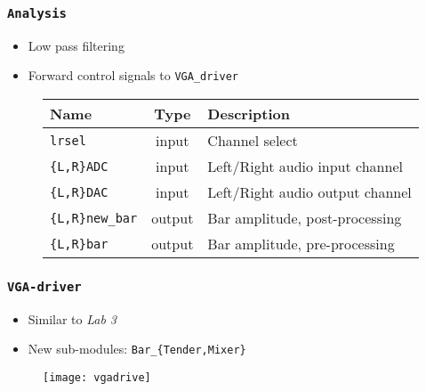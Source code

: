\begin{frame}
  \frametitle{\texttt{Analysis}}
    \begin{itemize}
      \item Low pass filtering
      \item Forward control signals to \texttt{VGA\_driver}
    \end{itemize}
    \begin{figure}
      \centering
      \begin{tabular}{|l|c|l|}
        \hline
        Name & Type & Description \\    \hline
        \texttt{lrsel} & input & Channel select \\    \hline
        \texttt{\{L,R\}ADC} & input & Left/Right audio input channel \\    \hline
        \texttt{\{L,R\}DAC} & input & Left/Right audio output channel \\    \hline
        \texttt{\{L,R\}new\_bar} & output & Bar amplitude, post-processing\\    \hline
        \texttt{\{L,R\}bar} & output & Bar amplitude, pre-processing\\    \hline
      \end{tabular}
    \end{figure}
\end{frame}

\begin{frame}
  \frametitle{\texttt{VGA-driver}}
    \begin{itemize}
      \item Similar to \emph{Lab 3} 
      \item New sub-modules: \texttt{Bar\_\{Tender,Mixer\}}
    \end{itemize}
    \begin{figure}
      \centering
      \texttt{[image: vgadrive]}
    \end{figure}
\end{frame}

